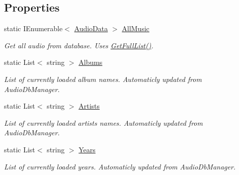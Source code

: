 \subsection*{Properties}
\begin{DoxyCompactItemize}
\item 
static I\+Enumerable$<$ \mbox{\hyperlink{classOSML_1_1Media_1_1AudioData}{Audio\+Data}} $>$ \mbox{\hyperlink{classOSML_1_1Data_1_1Music_1_1OSMLAudioData_a494a7af2d4115f352e35995f70027a12}{All\+Music}}
\begin{DoxyCompactList}\small\item\em Get all audio from database. Uses \mbox{\hyperlink{classOSML_1_1Data_1_1Music_1_1OSMLAudioData_a34edf0c6c48e34a22ee634a35e280c74}{Get\+Full\+List()}}. \end{DoxyCompactList}\item 
static List$<$ string $>$ \mbox{\hyperlink{classOSML_1_1Data_1_1Music_1_1OSMLAudioData_aa8a7c659bffbc411d7b463de7c64b79c}{Albums}}
\begin{DoxyCompactList}\small\item\em List of currently loaded album names. Automaticly updated from Audio\+Db\+Manager. \end{DoxyCompactList}\item 
static List$<$ string $>$ \mbox{\hyperlink{classOSML_1_1Data_1_1Music_1_1OSMLAudioData_acfcc0260b0e47fbc31d8860bdea51eb2}{Artists}}
\begin{DoxyCompactList}\small\item\em List of currently loaded artists names. Automaticly updated from Audio\+Db\+Manager. \end{DoxyCompactList}\item 
static List$<$ string $>$ \mbox{\hyperlink{classOSML_1_1Data_1_1Music_1_1OSMLAudioData_a629e1cf6d911b7154716e85ce95ca88c}{Years}}
\begin{DoxyCompactList}\small\item\em List of currently loaded years. Automaticly updated from Audio\+Db\+Manager. \end{DoxyCompactList}\end{DoxyCompactItemize}


